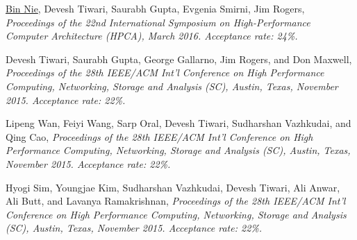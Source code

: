 {\textnormal{\newline \underline{Bin Nie}, Devesh Tiwari, Saurabh Gupta, Evgenia Smirni, Jim Rogers,}} {\textit{Proceedings of the 22nd International Symposium on High-Performance Computer Architecture (HPCA), March 2016. Acceptance rate: 24\%.\newline \newline \newline}}{}{}{} %





{\textnormal{\newline Devesh Tiwari, Saurabh Gupta, George Gallarno, Jim Rogers, and Don Maxwell,}} {\textit{Proceedings of the 28th IEEE/ACM Int'l Conference on High Performance Computing, Networking, Storage and Analysis (SC), Austin, Texas, November 2015. Acceptance rate: 22\%.\newline}}{}{}{} %
				
 {\textnormal{\newline Lipeng Wan, Feiyi Wang, Sarp Oral, Devesh Tiwari, Sudharshan Vazhkudai, and Qing Cao,}} {\textit{Proceedings of the 28th IEEE/ACM Int'l Conference on High Performance Computing, Networking, Storage and Analysis (SC), Austin, Texas, November 2015. Acceptance rate: 22\%.\newline}}{}{}{} %

{\textnormal{\newline Hyogi Sim, Youngjae Kim, Sudharshan Vazhkudai, Devesh Tiwari, Ali Anwar, Ali Butt, and Lavanya Ramakrishnan,}} {\textit{Proceedings of the 28th IEEE/ACM Int'l Conference on High Performance Computing, Networking, Storage and Analysis (SC), Austin, Texas, November 2015. Acceptance rate: 22\%.\newline}}{}{}{} %

